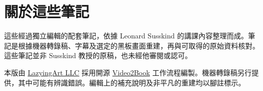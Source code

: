 \documentclass[11pt,oneside]{book}
\begin{document}
\frontmatter
\hypersetup{pageanchor=false}

\hypersetup{pageanchor=true}

\clearpage
\chapter*{關於這些筆記}
這些經過獨立編輯的配套筆記，依據 Leonard Susskind 的講課內容整理而成。筆記是根據機器轉錄稿、字幕及選定的黑板畫面重建，再與可取得的原始資料核對。這些筆記並非 Susskind 教授的原稿，也未經他審閱或認可。

本版由 \href{https://lazying.art}{LazyingArt LLC} 採用開源 \href{https://github.com/lachlanchen/Video2Book}{Video2Book} 工作流程編製。機器轉錄稿另行提供，其中可能有辨識錯誤。編輯上的補充說明及非平凡的重建均以腳註標示。
\clearpage
\tableofcontents
\mainmatter










\end{document}
